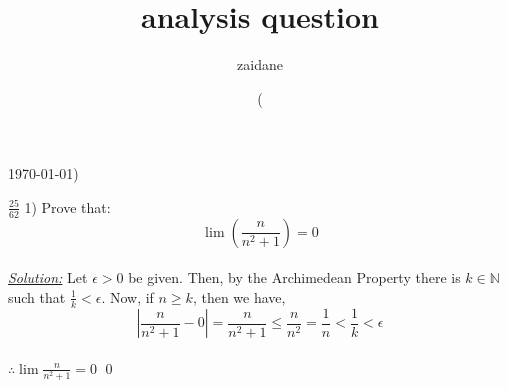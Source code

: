 \documentclass[30pt,a4paper]{amsbook}
\begin{document}
\author{zaidane}
\title{analysis question}
\date(\today)
\maketitle

{\large $\boxed{\frac{25}{62}}$}  1) Prove that: $$\lim \left(\frac{n}{n^2 +1}\right) = 0$$\\
\emph{\underline{Solution:}} Let $\epsilon > 0$ be given. Then, by the Archimedean Property there is $k \in \mathbb{N}$ such that $\frac{1}{k} < \epsilon$.
\vspace{0.3pt}
Now, if $n \geq k$, then we have,\\
$$\left|{\frac{n}{n^2 + 1} - 0}\right| = \frac{n}{n^2 + 1} \leq \frac{n}{n^2} = \frac{1}{n} < \frac{1}{k} < \epsilon$$\\
$\therefore \lim \frac{n}{n^2 + 1} = 0$ \qed
\end{document}
